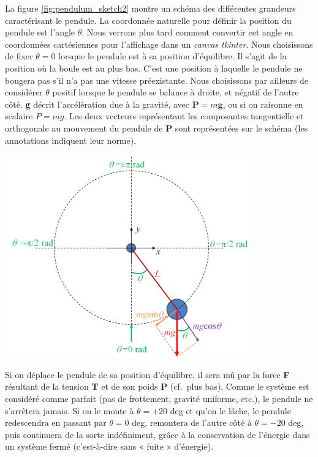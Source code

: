 \documentclass[a4paper,11pt,twoside]{book}
\let\origfigure=\figure
\let\endorigfigure=\endfigure
\renewenvironment{figure}[1][]{%
   \origfigure[!htbp]
}{%
   \endorigfigure
}
\begin{document}
La figure \ref{fig:pendulum_sketch2} montre un schéma des différentes
grandeurs caractérisant le pendule. La coordonnée naturelle pour définir
la position du pendule est l'angle \(\theta\). Nous verrons plus tard
comment convertir cet angle en coordonnées cartésiennes pour l'affichage
dans un \emph{canvas tkinter}. Nous choisissons de fixer \(\theta = 0\)
lorsque le pendule est à sa position d'équilibre. Il s'agit de la
position où la boule est au plus bas. C'est une position à laquelle le
pendule ne bougera pas s'il n'a pas une vitesse préexistante. Nous
choisissons par ailleurs de considérer \(\theta\) positif lorsque le
pendule se balance à droite, et négatif de l'autre côté. \textbf{g}
décrit l'accélération due à la gravité, avec
\(\boldsymbol{\mathbf P} = m \boldsymbol{\mathbf g}\), ou si on raisonne
en scalaire \(P = mg\). Les deux vecteurs représentant les composantes
tangentielle et orthogonale au mouvement du pendule de \textbf{P} sont
représentées sur le schéma (les annotations indiquent leur norme).

\begin{figure}[htbp]
\centering
\includegraphics[width=0.80000\textwidth]{img/pendulum_sketch2.png}
\caption{Caractérisation géométrique d'un pendule
simple.\label{fig:pendulum_sketch2}}
\end{figure}

Si on déplace le pendule de sa position d'équilibre, il sera mû par la
force \textbf{F} résultant de la tension \textbf{T} et de son poids
\textbf{P} (cf.~plus bas). Comme le système est considéré comme parfait
(pas de frottement, gravité uniforme, etc.), le pendule ne s'arrêtera
jamais. Si on le monte à \(\theta = +20\) deg et qu'on le lâche, le
pendule redescendra en passant par \(\theta = 0\) deg, remontera de
l'autre côté à \(\theta = -20\) deg, puis continuera de la sorte
indéfiniment, grâce à la conservation de l'énergie dans un système fermé
(c'est-à-dire sans « fuite » d'énergie).
\end{document}
